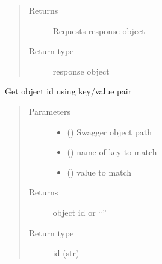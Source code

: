 \documentclass[letterpaper,10pt,english]{sphinxmanual}
\begin{document}
\begin{fulllineitems}
\begin{fulllineitems}
\begin{quote}
\begin{description}
\item[{Returns}] \leavevmode
\sphinxAtStartPar
Requests response object

\item[{Return type}] \leavevmode
\sphinxAtStartPar
response object

\end{description}\end{quote}

\end{fulllineitems}


\begin{fulllineitems}
\label{\detokenize{b1tdep-class:bloxone.b1tdep.get_id}}
\sphinxAtStartPar
Get object id using key/value pair
\begin{quote}\begin{description}
\item[{Parameters}] \leavevmode\begin{itemize}
\item {} 
\sphinxAtStartPar
{} () \textendash{} Swagger object path

\item {} 
\sphinxAtStartPar
{} () \textendash{} name of key to match

\item {} 
\sphinxAtStartPar
{} () \textendash{} value to match

\end{itemize}

\item[{Returns}] \leavevmode
\sphinxAtStartPar
object id or “”

\item[{Return type}] \leavevmode
\sphinxAtStartPar
id (str)


\end{description}
\end{quote}
\end{fulllineitems}
\end{fulllineitems}
\end{document}
